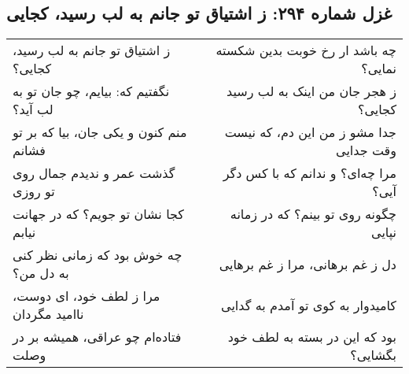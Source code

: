 \begin{center}
\section*{غزل شماره ۲۹۴: ز اشتیاق تو جانم به لب رسید، کجایی}
\label{sec:294}
\begin{longtable}{l p{0.5cm} r}
ز اشتیاق تو جانم به لب رسید، کجایی؟
&&
چه باشد ار رخ خوبت بدین شکسته نمایی؟
\\
نگفتیم که: بیایم، چو جان تو به لب آید؟
&&
ز هجر جان من اینک به لب رسید کجایی؟
\\
منم کنون و یکی جان، بیا که بر تو فشانم
&&
جدا مشو ز من این دم، که نیست وقت جدایی
\\
گذشت عمر و ندیدم جمال روی تو روزی
&&
مرا چه‌ای؟ و ندانم که با کس دگر آیی؟
\\
کجا نشان تو جویم؟ که در جهانت نیابم
&&
چگونه روی تو بینم؟ که در زمانه نپایی
\\
چه خوش بود که زمانی نظر کنی به دل من؟
&&
دل ز غم برهانی، مرا ز غم برهایی
\\
مرا ز لطف خود، ای دوست، ناامید مگردان
&&
کامیدوار به کوی تو آمدم به گدایی
\\
فتاده‌ام چو عراقی، همیشه بر در وصلت
&&
بود که این در بسته به لطف خود بگشایی؟
\\
\end{longtable}
\end{center}
